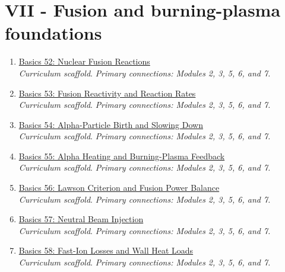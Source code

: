 \documentclass[11pt]{article}
\begin{document}
\section{VII - Fusion and burning-plasma foundations}
\begin{enumerate}[leftmargin=2.4em]
\item[\textbf{52.}] \href{run:basics_52_nuclear_fusion_reactions.pdf}{Basics 52: Nuclear Fusion Reactions}\\[-0.2em]
\textit{Curriculum scaffold}. \textit{Primary connections: Modules 2, 3, 5, 6, and 7.}
\item[\textbf{53.}] \href{run:basics_53_fusion_reactivity_and_reaction_rates.pdf}{Basics 53: Fusion Reactivity and Reaction Rates}\\[-0.2em]
\textit{Curriculum scaffold}. \textit{Primary connections: Modules 2, 3, 5, 6, and 7.}
\item[\textbf{54.}] \href{run:basics_54_alpha_particle_birth_and_slowing_down.pdf}{Basics 54: Alpha-Particle Birth and Slowing Down}\\[-0.2em]
\textit{Curriculum scaffold}. \textit{Primary connections: Modules 2, 3, 5, 6, and 7.}
\item[\textbf{55.}] \href{run:basics_55_alpha_heating_and_burning_plasma_feedback.pdf}{Basics 55: Alpha Heating and Burning-Plasma Feedback}\\[-0.2em]
\textit{Curriculum scaffold}. \textit{Primary connections: Modules 2, 3, 5, 6, and 7.}
\item[\textbf{56.}] \href{run:basics_56_lawson_criterion_and_fusion_power_balance.pdf}{Basics 56: Lawson Criterion and Fusion Power Balance}\\[-0.2em]
\textit{Curriculum scaffold}. \textit{Primary connections: Modules 2, 3, 5, 6, and 7.}
\item[\textbf{57.}] \href{run:basics_57_neutral_beam_injection.pdf}{Basics 57: Neutral Beam Injection}\\[-0.2em]
\textit{Curriculum scaffold}. \textit{Primary connections: Modules 2, 3, 5, 6, and 7.}
\item[\textbf{58.}] \href{run:basics_58_fast_ion_losses_and_wall_heat_loads.pdf}{Basics 58: Fast-Ion Losses and Wall Heat Loads}\\[-0.2em]
\textit{Curriculum scaffold}. \textit{Primary connections: Modules 2, 3, 5, 6, and 7.}
\end{enumerate}
\end{document}
